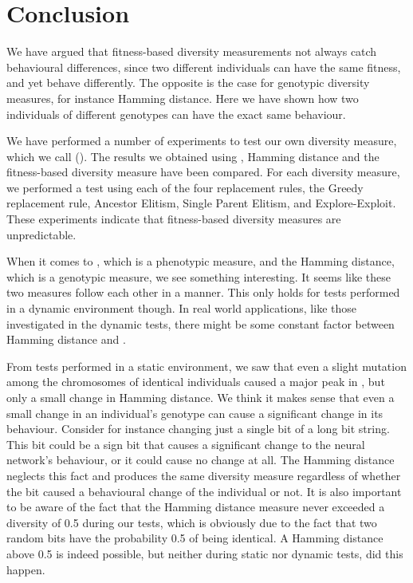 \section{Conclusion}\label{sec:conclusion}
We have argued that fitness-based diversity measurements not always catch behavioural differences, since two different individuals can have the same fitness, and yet behave differently.
The opposite is the case for genotypic diversity measures, for instance Hamming distance.
Here we have shown how two individuals of different genotypes can have the exact same behaviour.

We have performed a number of experiments to test our own diversity measure, which we call \di{} (\dia{}).
The results we obtained using \dia{}, Hamming distance and the fitness-based diversity measure have been compared.
For each diversity measure, we performed a test using each of the four replacement rules, the Greedy replacement rule, Ancestor Elitism, Single Parent Elitism, and Explore-Exploit.
These experiments indicate that fitness-based diversity measures are unpredictable.

When it comes to \dia{}, which is a phenotypic measure, and the Hamming distance, which is a genotypic measure, we see something interesting. It seems like these two measures follow each other in a manner.
This only holds for tests performed in a dynamic environment though. 
In real world applications, like those investigated in the dynamic tests, there might be some constant factor between Hamming distance and \dia{}.

From tests performed in a static environment, we saw that even a slight mutation among the chromosomes of identical individuals caused a major peak in \dia{}, but only a small change in Hamming distance.
We think it makes sense that even a small change in an individual's genotype can cause a significant change in its behaviour. Consider for instance changing just a single bit of a long bit string. This bit could be a sign bit that causes a significant change to the neural network's behaviour, or it could cause no change at all.
The Hamming distance neglects this fact and produces the same diversity measure regardless of whether the bit caused a behavioural change of the individual or not.
It is also important to be aware of the fact that the Hamming distance measure never exceeded a diversity of \num{0.5} during our tests, which is obviously due to the fact that two random bits have the probability \num{0.5} of being identical.
A Hamming distance above \num{0.5} is indeed possible, but neither during static nor dynamic tests, did this happen. 

